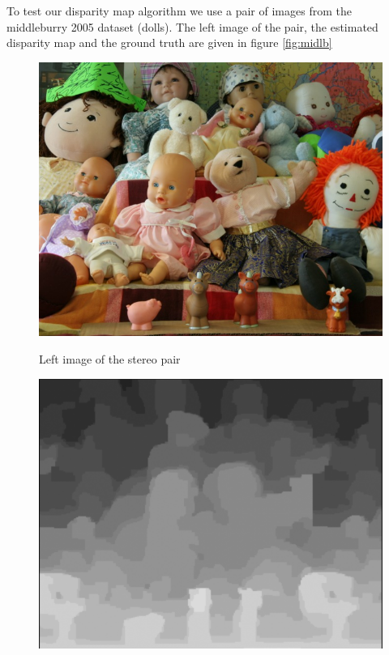 \documentclass[10pt,twocolumn,letterpaper]{article}
\begin{document}
To test our disparity map algorithm we use a pair of images from the middleburry 2005 dataset (dolls). The left image of the pair, the estimated disparity map and the ground truth are given in figure \ref{fig:midlb}
\begin{figure}
    \centering
    \begin{minipage}[t]{0.4\textwidth}
    \centerline{\includegraphics[width=\textwidth]{midb1.jpg}}
    \centerline{Left image of the stereo pair}
    \end{minipage}
    \hfill
    \begin{minipage}[t]{0.23\textwidth}   
    \centerline{\includegraphics[width=\textwidth]{output_midlb.png}}

\end{minipage}
\end{figure}
\end{document}
